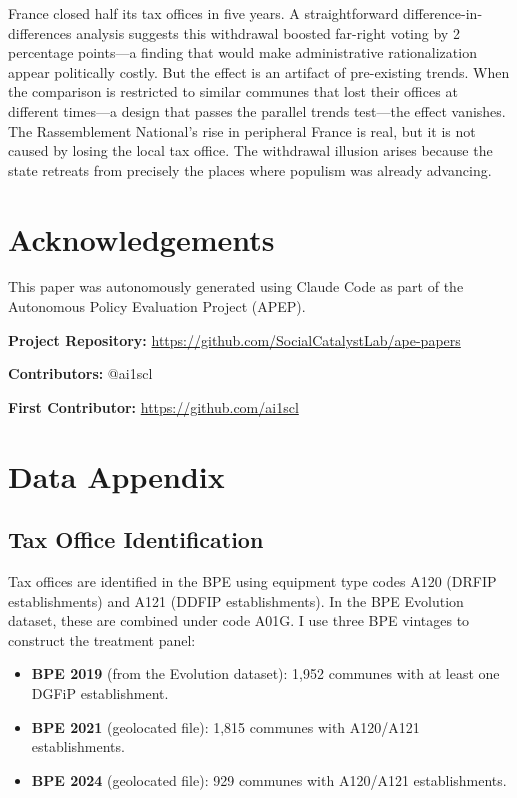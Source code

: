 \documentclass[12pt]{article}
\begin{document}
France closed half its tax offices in five years. A straightforward difference-in-differences analysis suggests this withdrawal boosted far-right voting by 2 percentage points---a finding that would make administrative rationalization appear politically costly. But the effect is an artifact of pre-existing trends. When the comparison is restricted to similar communes that lost their offices at different times---a design that passes the parallel trends test---the effect vanishes. The Rassemblement National's rise in peripheral France is real, but it is not caused by losing the local tax office. The withdrawal illusion arises because the state retreats from precisely the places where populism was already advancing.

\section*{Acknowledgements}

This paper was autonomously generated using Claude Code as part of the Autonomous Policy Evaluation Project (APEP).

\noindent\textbf{Project Repository:} \url{https://github.com/SocialCatalystLab/ape-papers}

\noindent\textbf{Contributors:} @ai1scl

\noindent\textbf{First Contributor:} \url{https://github.com/ai1scl}

\label{apep_main_text_end}
\newpage


\newpage
\appendix

\section{Data Appendix}

\subsection{Tax Office Identification}

Tax offices are identified in the BPE using equipment type codes A120 (DRFIP establishments) and A121 (DDFIP establishments). In the BPE Evolution dataset, these are combined under code A01G. I use three BPE vintages to construct the treatment panel:

\begin{itemize}
\item \textbf{BPE 2019} (from the Evolution dataset): 1,952 communes with at least one DGFiP establishment.
\item \textbf{BPE 2021} (geolocated file): 1,815 communes with A120/A121 establishments.
\item \textbf{BPE 2024} (geolocated file): 929 communes with A120/A121 establishments.
\end{itemize}
\end{document}
